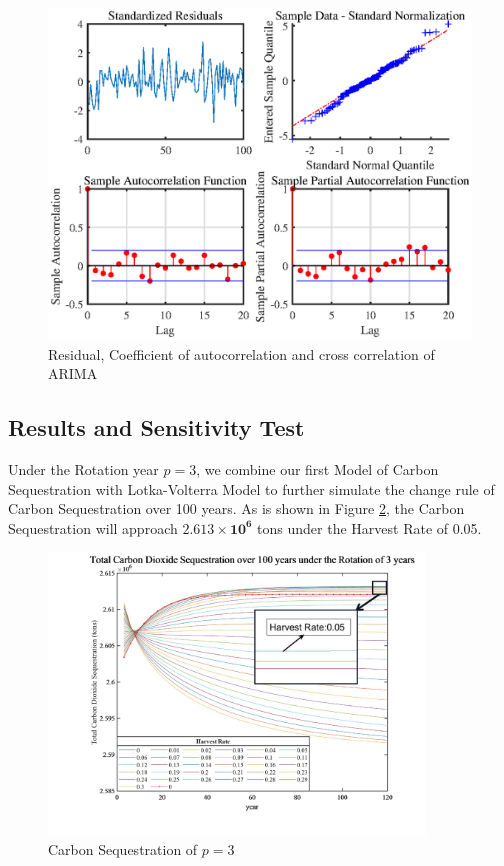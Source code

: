 \documentclass{mcmthesis}
\numberwithin{figure}{section}
\numberwithin{table}{section}
\numberwithin{equation}{section}
\begin{document}
\begin{figure}[htbp]
  \centering
  \includegraphics[width = 12cm]{code&pic/ARIMA残差&自相关互相关系数.eps}
  \caption{Residual, Coefficient of autocorrelation and cross correlation of ARIMA}\label{ARIMA Res}
\end{figure}

\newpage

\subsection{Results and Sensitivity Test}\label{applicationResult}
Under the Rotation year $ p = 3 $, we combine our first Model of Carbon Sequestration
with Lotka-Volterra Model to further simulate the change rule of Carbon Sequestration 
over 100 years. As is shown in Figure \ref{Rotation3}, the Carbon Sequestration will
approach $ \bm{2.613\times 10^6} $ tons under the Harvest Rate of 0.05.

\begin{figure}[htbp]
  \centering
  \includegraphics[width = 10cm]{code&pic/轮伐3年.pdf}
  \caption{Carbon Sequestration of $ p=3 $ }\label{Rotation3}
\end{figure}
\end{document}
